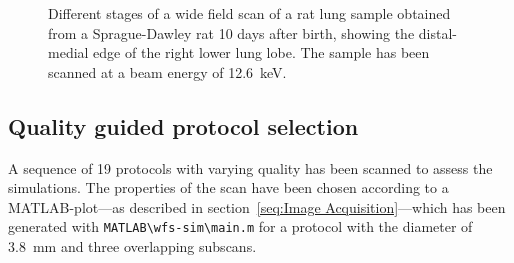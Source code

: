 \begin{figure}
{
			\label{fig:merge-rec}
			}
	\caption{Different stages of a wide field scan of a rat lung sample obtained from a Sprague-Dawley rat 10 days after birth, showing the distal-medial edge of the right lower lung lobe. The sample has been scanned at a beam energy of \SI{12.6}{\kilo\electronvolt}.}
	\label{fig:wide field scan results}	
\end{figure}

\subsection{Quality guided protocol selection}
A sequence of 19 protocols with varying quality has been scanned to assess the simulations. The properties of the scan have been chosen according to a MATLAB-plot---as described in section~\ref{seq:Image Acquisition}---which has been generated with \verb+MATLAB\wfs-sim\main.m+  for a protocol with the diameter of \SI{3.8}{mm} and three overlapping subscans.

